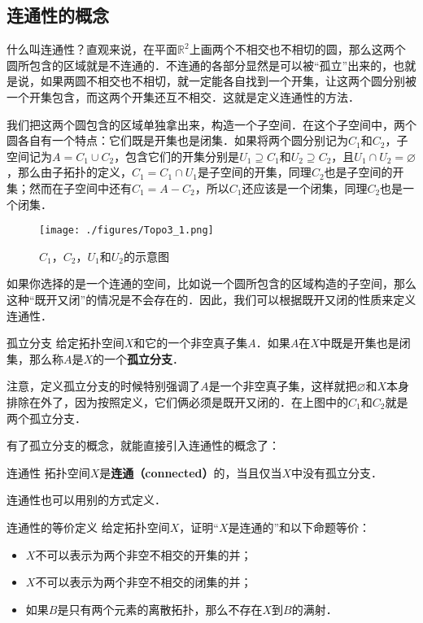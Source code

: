 

\subsection{连通性的概念}
什么叫连通性？直观来说，在平面$\mathbb{R}^2$上画两个不相交也不相切的圆，那么这两个圆所包含的区域就是不连通的．不连通的各部分显然是可以被“孤立”出来的，也就是说，如果两圆不相交也不相切，就一定能各自找到一个开集，让这两个圆分别被一个开集包含，而这两个开集还互不相交．这就是定义连通性的方法．

我们把这两个圆包含的区域单独拿出来，构造一个子空间．在这个子空间中，两个圆各自有一个特点：它们既是开集也是闭集．如果将两个圆分别记为$C_1$和$C_2$，子空间记为$A=C_1\cup C_2$，包含它们的开集分别是$U_1\supseteq C_1$和$U_2\supseteq C_2$，且$U_1\cap U_2=\varnothing$，那么由子拓扑的定义，$C_1=C_1\cap U_1$是子空间的开集，同理$C_2$也是子空间的开集；然而在子空间中还有$C_1=A-C_2$，所以$C_1$还应该是一个闭集，同理$C_2$也是一个闭集．

\begin{figure}[ht]
\centering
\texttt{[image: ./figures/Topo3\_1.png]}
\caption{$C_1$，$C_2$，$U_1$和$U_2$的示意图} \label{Topo3_fig1}
\end{figure}

如果你选择的是一个连通的空间，比如说一个圆所包含的区域构造的子空间，那么这种“既开又闭”的情况是不会存在的．因此，我们可以根据既开又闭的性质来定义连通性．

\begin{definition}{孤立分支}
给定拓扑空间$X$和它的一个非空真子集$A$．如果$A$在$X$中既是开集也是闭集，那么称$A$是$X$的一个\textbf{孤立分支}．
\end{definition}

注意，定义孤立分支的时候特别强调了$A$是一个非空真子集，这样就把$\varnothing$和$X$本身排除在外了，因为按照定义，它们俩必须是既开又闭的．在上图中的$C_1$和$C_2$就是两个孤立分支．

有了孤立分支的概念，就能直接引入连通性的概念了：

\begin{definition}{连通性}
拓扑空间$X$是\textbf{连通（connected）}的，当且仅当$X$中没有孤立分支．
\end{definition}

连通性也可以用别的方式定义．

\begin{exercise}{连通性的等价定义}\label{Topo3_exe1}
给定拓扑空间$X$，证明“$X$是连通的”和以下命题等价：
\begin{itemize}
\item $X$不可以表示为两个非空不相交的开集的并；
\item $X$不可以表示为两个非空不相交的闭集的并；
\item 如果$B$是只有两个元素的离散拓扑，那么不存在$X$到$B$的满射．

\end{itemize}
\end{exercise}

